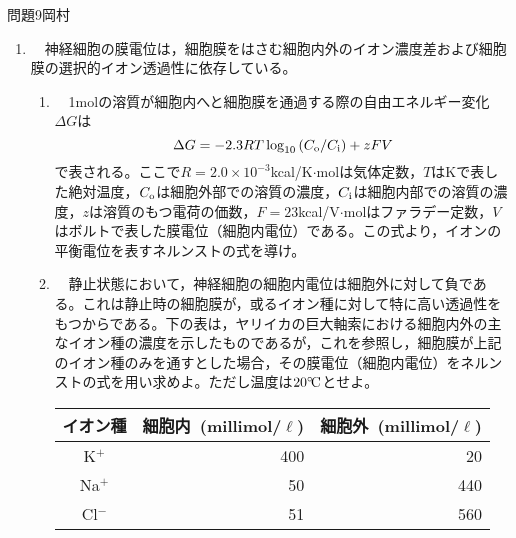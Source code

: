 \documentclass[fleqn]{jbook}
\def\o{{\rm o}}
\def\i{{\rm i}}
\begin{document}

\begin{question}{問題9}{岡村}
\setcounter{equation}{0}

\begin{enumerate}

  \item 　神経細胞の膜電位は，細胞膜をはさむ細胞内外のイオン濃度差および細胞膜の選択的イオン透過性に依存している。\\
  
    \begin{enumerate}
    
    \item 　1molの溶質が細胞内へと細胞膜を通過する際の自由エネルギー変化$\Delta G$は
    $$
    \Delta G = -2.3RT\log_{10}\left( C_\o/C_\i \right)+zFV
    $$
    で表される。ここで$R=2.0\times10^{-3}$kcal/K$\cdot$molは気体定数，$T$はKで表した絶対温度，$C_\o$は細胞外部での溶質の濃度，$C_\i$は細胞内部での溶質の濃度，$z$は溶質のもつ電荷の価数，$F=23$kcal/V$\cdot$molはファラデー定数，$V$はボルトで表した膜電位（細胞内電位）である。この式より，イオンの平衡電位を表すネルンストの式を導け。
    
    \item 　静止状態において，神経細胞の細胞内電位は細胞外に対して負である。これは静止時の細胞膜が，或るイオン種に対して特に高い透過性をもつからである。下の表は，ヤリイカの巨大軸索における細胞内外の主なイオン種の濃度を示したものであるが，これを参照し，細胞膜が上記のイオン種のみを通すとした場合，その膜電位（細胞内電位）をネルンストの式を用い求めよ。ただし温度は$20^{\circ}\!\rm C$とせよ。\\
\begin{table}[hbtp]
\begin{center}
\vspace{-2mm}
\begin{tabular}[h]{c|r|r}
イオン種    &細胞内~(millimol/$\ell$)   &細胞外~(millimol/$\ell$)\\
\hline
K${}^+$     &400                        &20\\
Na${}^+$    &50                         &440\\
Cl${}^-$    &51                         &560\\
\end{tabular}
\end{center}
\end{table}
    

\end{enumerate}
\end{enumerate}
\end{question}
\end{document}
